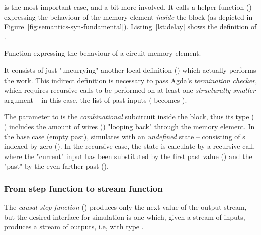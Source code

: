             is the most important case, and a bit more involved.
            It calls a helper function ()
            expressing the behaviour of the memory element \emph{inside} the  block
            (as depicted in Figure~\ref{fig:semantics-syn-fundamental}).
            Listing~\ref{lst:delay} shows the definition of .

            \begin{listing}[h]
                \caption{Function expressing the behaviour of a circuit memory element.\label{lst:delay}}
            \end{listing}

            It consists of just "uncurrying" another local definition () which actually
            performs the work.
            This indirect definition is necessary to pass Agda's \emph{termination checker},
            which requires recursive calls to be performed on at least one \emph{structurally smaller}
            argument – in this case, the list of past inputs (   becomes ).

            The  parameter to  is the \emph{combinational} subcircuit inside the  block,
            thus its type ( \AY{:} \AY{(} \AF{+} \AY{)} \AY{(} \AF{+} \AY{)})
            includes the amount of wires () "looping back" through the memory element.
            In the base case (empty past),  simulates   
            with an \emph{undefined} state – consisting of s indexed by zero ().
            In the recursive case, the state is calculate by a recursive call,
            where the "current" input has been substituted by the first past value () and the "past"
            by the even farther past ().

            \subsubsection{From step function to stream function}
            \label{subsubsec:step-stream}
            The \emph{causal step function} () produces only the next value of the
            output stream, but the desired interface for simulation is one which, given a stream of
            inputs, produces a stream of outputs, i.e, with type
             \AY{(} \AY{)}   \AY{(} \AY{)}.

